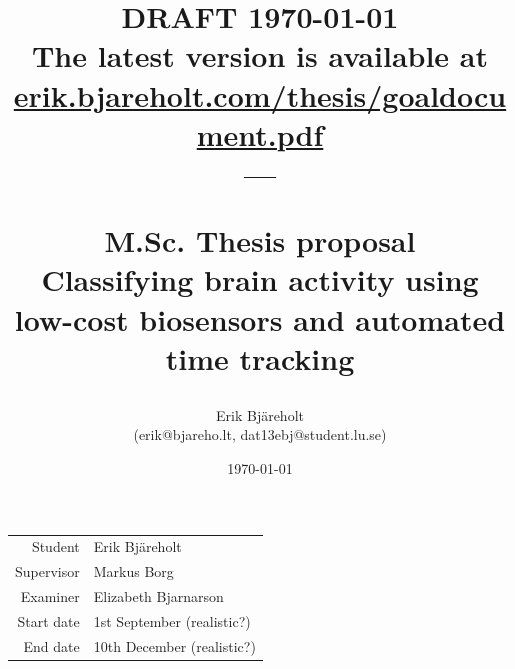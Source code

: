 \documentclass{IEEEtran}
\title{%
    \small DRAFT \today \\
    \small The latest version is available at \href{https://erik.bjareholt.com/thesis/goaldocument.pdf}{erik.bjareholt.com/thesis/goaldocument.pdf}\\
    \large --- \\
    \large \par M.Sc. Thesis proposal\\
    \huge Classifying brain activity using low-cost biosensors and automated time tracking \\
}
\author{Erik Bjäreholt \\(erik@bjareho.lt, dat13ebj@student.lu.se)}
\date{\today}
\begin{document}
\maketitle

\begin{center}
\begin{tabular}{r l}
 Student & Erik Bjäreholt \\
 Supervisor & Markus Borg \\
 Examiner & Elizabeth Bjarnarson \\
 Start date & 1st September (realistic?) \\
 End date & 10th December (realistic?) \\
\end{tabular}
\end{center}

\setlength{\parskip}{0em}
\tableofcontents
\setlength{\parskip}{1em}

\end{document}
